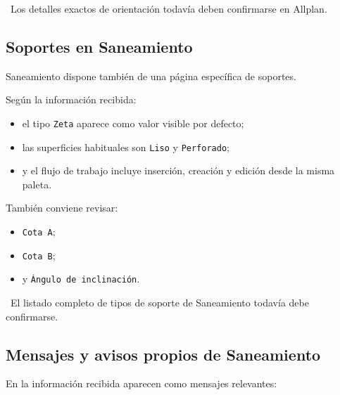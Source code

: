 \pendingtag\ Los detalles exactos de orientación todavía deben confirmarse en Allplan.


\subsection{Soportes en Saneamiento}

Saneamiento dispone también de una página específica de soportes.

Según la información recibida:

\begin{itemize}
\item el tipo \texttt{Zeta} aparece como valor visible por defecto;
\item las superficies habituales son \texttt{Liso} y \texttt{Perforado};
\item y el flujo de trabajo incluye inserción, creación y edición desde la misma paleta.
\end{itemize}

También conviene revisar:

\begin{itemize}
\item \texttt{Cota A};
\item \texttt{Cota B};
\item y \texttt{Ángulo de inclinación}.
\end{itemize}

\pendingtag\ El listado completo de tipos de soporte de Saneamiento todavía debe confirmarse.


\subsection{Mensajes y avisos propios de Saneamiento}

En la información recibida aparecen como mensajes relevantes:

